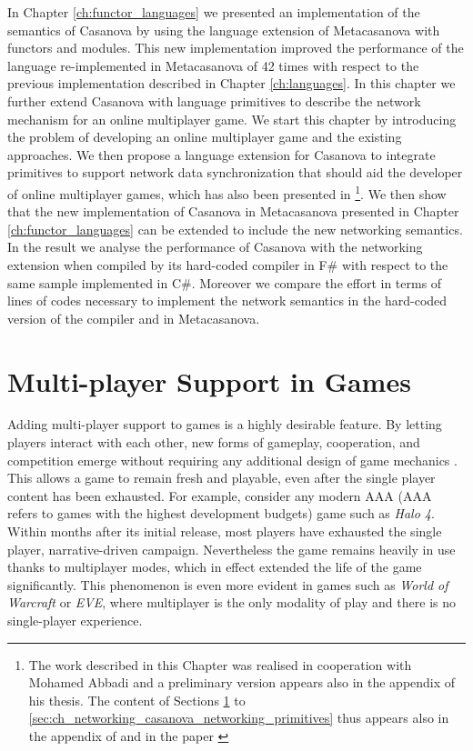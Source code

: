 In Chapter \ref{ch:functor_languages} we presented an implementation of the semantics of Casanova by using the language extension of Metacasanova with functors and modules. This new implementation improved the performance of the language re-implemented in Metacasanova of 42 times with respect to the previous implementation described in Chapter \ref{ch:languages}. In this chapter we further extend Casanova with language primitives to describe the network mechanism for an online multiplayer game. We start this chapter by introducing the problem of developing an online multiplayer game and the existing approaches. We then propose a language extension for Casanova to integrate primitives to support network data synchronization that should aid the developer of online multiplayer games, which has also been presented in \cite{DIGIACOMO201725}\footnote{The work described in this Chapter was realised in cooperation with Mohamed Abbadi and a preliminary version appears also in the appendix of his thesis. The content of Sections \ref{sec:ch_networking_mpsupport} to \ref{sec:ch_networking_casanova_networking_primitives} thus appears also in the appendix of \cite{abbadithesis2017} and in the paper \cite{DIGIACOMO201725}}. We then show that the new implementation of Casanova in Metacasanova presented in Chapter \ref{ch:functor_languages} can be extended to include the new networking semantics. In the result we analyse the performance of Casanova with the networking extension when compiled by its hard-coded compiler in F\# with respect to the same sample implemented in C\#. Moreover we compare the effort in terms of lines of codes necessary to implement the network semantics in the hard-coded version of the compiler and in Metacasanova.

\section{Multi-player Support in Games}
\label{sec:ch_networking_mpsupport}
Adding multi-player support to games is a highly desirable feature. By letting players interact with each other, new forms of gameplay, cooperation, and competition emerge without requiring any additional design of game mechanics \cite{granberg2014david}. This allows a game to remain fresh and playable, even after the single player content has been exhausted. For example, consider any modern AAA (AAA refers to games with the highest development budgets\cite{wolf2008video}) game such as \textit{Halo 4}. Within months after its initial release, most players have exhausted the single player, narrative-driven campaign. Nevertheless the game remains heavily in use thanks to multiplayer modes, which in effect extended the life of the game significantly. This phenomenon is even more evident in games such as \textit{World of Warcraft} or \textit{EVE}, where multiplayer is the only modality of play and there is no single-player experience.

